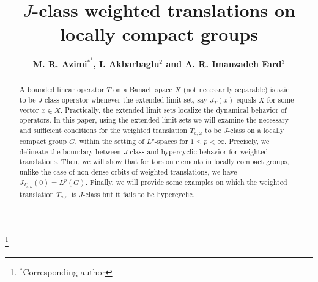 \documentclass{amsart}
\theoremstyle{definition}\newtheorem{defn}[thm]{Definition}
\theoremstyle{remark}
\numberwithin{equation}{section}
\begin{document}
\title[$J$-class  weighted translations on L. C. G. ]
{$J$-class weighted translations
 on locally compact groups}

\author{\bf  M. R. Azimi$^{*^1}$,   I.
Akbarbaglu$^2$ and A. R. Imanzadeh Fard$^3$ }


\address {M. R. Azimi}

\address{I. Akbarbaglu}

\address{A. R. Imanzadeh Fard}


\address{$1, 3$: Department of Mathematics, Faculty of Sciences,
University of Maragheh, P.O. Box: 55181-83111, Golshahr, Maragheh,
Iran}

\address{ $^{2}$ Department of Mathematics Education,
Farhangian University, P.O. Box: 14665-889, Tehran, Iran}

\thanks{$^*$Corresponding author}






\date{}

\dedicatory{}

\commby{}


\begin{abstract}
A bounded linear operator $T$ on a Banach space $X$ (not necessarily
separable) is said to be $J$-class operator whenever the extended
limit set, say $J_T(x)$ equals $X$ for some vector $x\in X$.
Practically, the extended limit sets localize the dynamical behavior
of operators.
 In this paper, using the extended limit sets we will examine the necessary
 and sufficient conditions for the  weighted translation $T_{a,\omega}$
  to be $J$-class  on a locally compact group $G$,
 within the setting of $ L^p$-spaces for $ 1 \leq p < \infty $.
 Precisely, we delineate the boundary between $J$-class and
hypercyclic behavior for weighted translations. Then, we will show
that for  torsion elements in  locally compact
 groups,  unlike the case of  non-dense orbits of  weighted
translations, we have $J_{T_{a,\omega}}(0)=L^p(G)$.
 Finally, we will provide some examples on which the  weighted translation
$ T_{a,\omega}$ is $J$-class but it fails to be hypercyclic.



\end{abstract}
\maketitle
\end{document}
